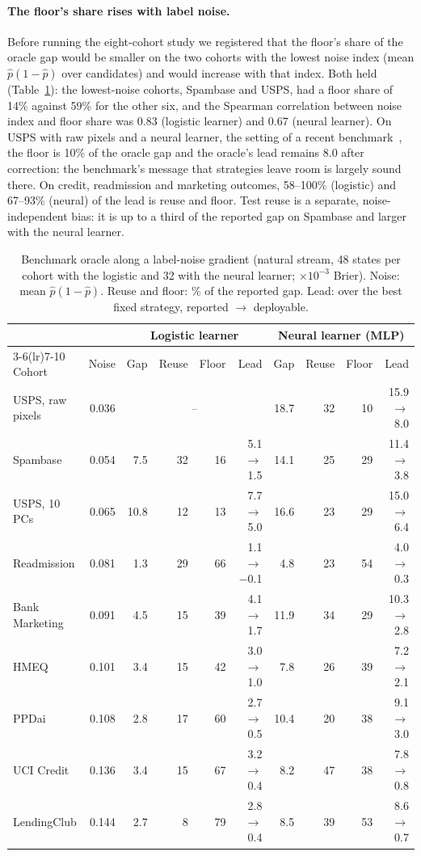\documentclass[runningheads]{llncs}
\begin{document}
\paragraph{The floor's share rises with label noise.} Before running the eight-cohort study we registered that the floor's share of the oracle gap would be smaller on the two cohorts with the lowest noise index (mean $\hat p(1-\hat p)$ over candidates) and would increase with that index. Both held (Table~\ref{tab:gradient}): the lowest-noise cohorts, Spambase and USPS, had a floor share of 14\% against 59\% for the other six, and the Spearman correlation between noise index and floor share was $0.83$ (logistic learner) and $0.67$ (neural learner). On USPS with raw pixels and a neural learner, the setting of a recent benchmark~\cite{werner2024cdalbench}, the floor is 10\% of the oracle gap and the oracle's lead remains $8.0$ after correction: the benchmark's message that strategies leave room is largely sound there. On credit, readmission and marketing outcomes, 58--100\% (logistic) and 67--93\% (neural) of the lead is reuse and floor. Test reuse is a separate, noise-independent bias: it is up to a third of the reported gap on Spambase and larger with the neural learner.

\begin{table}[t]
\caption{Benchmark oracle along a label-noise gradient (natural stream, 48 states per cohort with the logistic and 32 with the neural learner; $\times10^{-3}$ Brier). Noise: mean $\hat p(1-\hat p)$. Reuse and floor: \% of the reported gap. Lead: over the best fixed strategy, reported $\to$ deployable.}
\label{tab:gradient}
\centering\scriptsize
\setlength{\tabcolsep}{2.6pt}
\begin{tabular}{lrrrrrrrrr}
\toprule
& & \multicolumn{4}{c}{Logistic learner} & \multicolumn{4}{c}{Neural learner (MLP)} \\
\cmidrule(lr){3-6}\cmidrule(lr){7-10}
Cohort & Noise & Gap & Reuse & Floor & Lead & Gap & Reuse & Floor & Lead \\
\midrule
USPS, raw pixels & 0.036 & \multicolumn{4}{c}{--} & 18.7 & 32 & 10 & 15.9$\to$8.0 \\
Spambase & 0.054 & 7.5 & 32 & 16 & 5.1$\to$1.5 & 14.1 & 25 & 29 & 11.4$\to$3.8 \\
USPS, 10 PCs & 0.065 & 10.8 & 12 & 13 & 7.7$\to$5.0 & 16.6 & 23 & 29 & 15.0$\to$6.4 \\
Readmission & 0.081 & 1.3 & 29 & 66 & 1.1$\to$$-$0.1 & 4.8 & 23 & 54 & 4.0$\to$0.3 \\
Bank Marketing & 0.091 & 4.5 & 15 & 39 & 4.1$\to$1.7 & 11.9 & 34 & 29 & 10.3$\to$2.8 \\
HMEQ & 0.101 & 3.4 & 15 & 42 & 3.0$\to$1.0 & 7.8 & 26 & 39 & 7.2$\to$2.1 \\
PPDai & 0.108 & 2.8 & 17 & 60 & 2.7$\to$0.5 & 10.4 & 20 & 38 & 9.1$\to$3.0 \\
UCI Credit & 0.136 & 3.4 & 15 & 67 & 3.2$\to$0.4 & 8.2 & 47 & 38 & 7.8$\to$0.8 \\
LendingClub & 0.144 & 2.7 & 8 & 79 & 2.8$\to$0.4 & 8.5 & 39 & 53 & 8.6$\to$0.7 \\
\bottomrule
\end{tabular}
\end{table}
\end{document}
